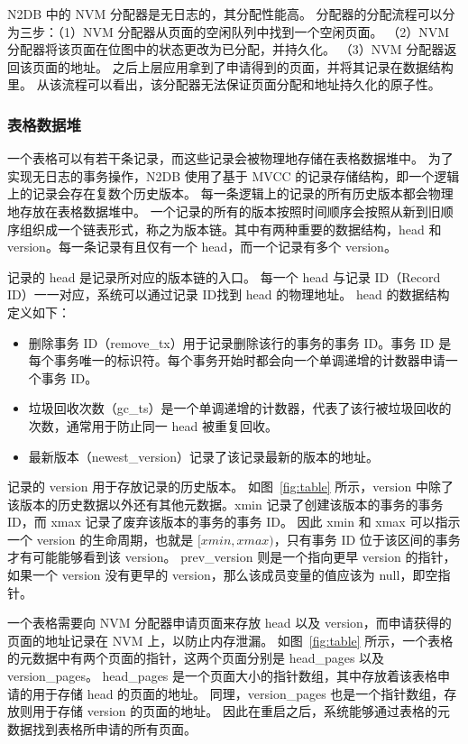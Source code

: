 N2DB 中的 NVM 分配器是无日志的，其分配性能高。
分配器的分配流程可以分为三步：（1）NVM 分配器从页面的空闲队列中找到一个空闲页面。
（2）NVM 分配器将该页面在位图中的状态更改为已分配，并持久化。
（3）NVM 分配器返回该页面的地址。
之后上层应用拿到了申请得到的页面，并将其记录在数据结构里。
从该流程可以看出，该分配器无法保证页面分配和地址持久化的原子性。

\subsubsection{表格数据堆}

一个表格可以有若干条记录，而这些记录会被物理地存储在表格数据堆中。
为了实现无日志的事务操作，N2DB 使用了基于 MVCC 的记录存储结构，即一个逻辑上的记录会存在复数个历史版本。
每一条逻辑上的记录的所有历史版本都会物理地存放在表格数据堆中。
一个记录的所有的版本按照时间顺序会按照从新到旧顺序组织成一个链表形式，称之为版本链。其中有两种重要的数据结构，head 和 version。每一条记录有且仅有一个 head，而一个记录有多个 version。

记录的 head 是记录所对应的版本链的入口。
每一个 head 与记录 ID（Record ID）一一对应，系统可以通过记录 ID找到 head 的物理地址。
head 的数据结构定义如下：
\begin{itemize}
    \item 删除事务 ID（remove\_tx）用于记录删除该行的事务的事务 ID。事务 ID 是每个事务唯一的标识符。每个事务开始时都会向一个单调递增的计数器申请一个事务 ID。
    \item 垃圾回收次数（gc\_ts）是一个单调递增的计数器，代表了该行被垃圾回收的次数，通常用于防止同一 head 被重复回收。
    \item 最新版本（newest\_version）记录了该记录最新的版本的地址。
\end{itemize}

记录的 version 用于存放记录的历史版本。
如图~\ref{fig:table} 所示，version 中除了该版本的历史数据以外还有其他元数据。xmin 记录了创建该版本的事务的事务 ID，而 xmax 记录了废弃该版本的事务的事务 ID。
因此 xmin 和 xmax 可以指示一个 version 的生命周期，也就是 $[xmin, xmax)$，只有事务 ID 位于该区间的事务才有可能能够看到该 version。
prev\_version 则是一个指向更早 version 的指针，如果一个 version 没有更早的 version，那么该成员变量的值应该为 null，即空指针。

一个表格需要向 NVM 分配器申请页面来存放 head 以及 version，而申请获得的页面的地址记录在 NVM 上，以防止内存泄漏。
如图~\ref{fig:table} 所示，一个表格的元数据中有两个页面的指针，这两个页面分别是 head\_pages 以及 version\_pages。
head\_pages 是一个页面大小的指针数组，其中存放着该表格申请的用于存储 head 的页面的地址。
同理，version\_pages 也是一个指针数组，存放则用于存储 version 的页面的地址。
因此在重启之后，系统能够通过表格的元数据找到表格所申请的所有页面。

